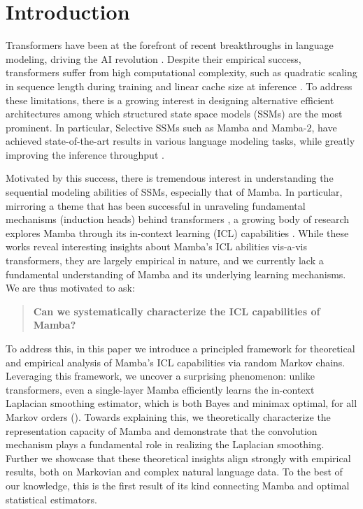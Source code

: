 
\section{Introduction}
\label{sec:intro}
Transformers have been at the forefront of recent breakthroughs in language modeling, driving the AI revolution \cite{vaswani2017attention, Radford2018ImprovingLU, devlin18}. Despite their empirical success, transformers suffer from high computational complexity, such as quadratic scaling in sequence length during training and linear cache size at inference \cite{gu2023mamba}. To address these limitations, there is a growing interest in designing alternative efficient architectures among which structured state space models (SSMs) are the most prominent. In particular, Selective SSMs such as Mamba and Mamba-$2$, have achieved state-of-the-art results in various language modeling tasks, while greatly improving the inference throughput \cite{cirone2025theoreticalfoundationsdeepselective}.

Motivated by this success, there is tremendous interest in understanding the sequential modeling abilities of SSMs, especially that of Mamba. In particular, mirroring a theme that has been successful in unraveling fundamental mechanisms (\eg induction heads) behind transformers \cite{makkuva2024attention, makkuva2024local, rajaraman2024transformersmarkovdataconstant, nic2024trans, edelman2024evolution}, a growing body of research explores Mamba through its in-context learning (ICL) capabilities \cite{grazzi2024mamba,halloran2024mamba,akyurek2024context}. While these works reveal interesting insights about Mamba's ICL abilities vis-a-vis transformers, they are largely empirical in nature, and we currently lack a fundamental understanding of Mamba and its underlying learning mechanisms. We are thus motivated to ask:
\begin{quote}
\centering
{\bf Can we systematically characterize the ICL capabilities of Mamba?}
\end{quote}

To address this, in this paper we introduce a principled framework for theoretical and empirical analysis of Mamba's ICL capabilities via random Markov chains. Leveraging this framework, we uncover a surprising phenomenon: unlike transformers, even a single-layer Mamba efficiently learns the in-context Laplacian smoothing estimator, which is both
Bayes and minimax optimal, for all Markov orders (). Towards explaining this, we theoretically characterize the representation capacity of Mamba and demonstrate that the convolution mechanism plays a fundamental role in realizing the Laplacian smoothing. Further we showcase that these theoretical insights align strongly with empirical results, both on Markovian and complex natural language data. To the best of our knowledge, this is the first result of its kind connecting Mamba and optimal statistical estimators.


